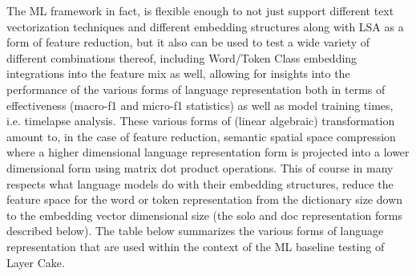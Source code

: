 \documentclass[final]{clv2025}
\begin{document}
The ML framework in fact, is flexible enough to not just support different text vectorization techniques and different embedding structures along with LSA as a form of feature reduction, but it also can be used to test a wide variety of different combinations thereof, including Word/Token Class embedding integrations into the feature mix as well, allowing for insights into the performance of the various forms of language representation both in terms of effectiveness (macro-f1 and micro-f1 statistics) as well as model training times, i.e. timelapse analysis. These various forms of (linear algebraic) transformation amount to, in the case of feature reduction, semantic spatial space compression where a higher dimensional language representation form is projected into a lower dimensional form using matrix dot product operations. This of course in many respects what language models do with their embedding structures, reduce the feature space for the word or token representation from the dictionary size down to the embedding vector dimensional size (the solo and doc representation forms described below). The table below summarizes the various forms of language representation that are used within the context of the ML baseline testing of Layer Cake.
\end{document}
